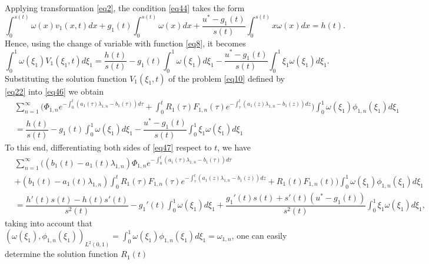 \documentclass[preprint,12pt,authoryear]{elsarticle}
\begin{document}
Applying transformation \eqref{eq2}, the condition \eqref{eq44} takes the form
\begin{equation}\label{eq45}
    \int_0^{s(t)}\omega(x)v_1(x,t)dx+g_1(t)\int_0^{s(t)}\omega(x)dx+\dfrac{u^*-g_1(t)}{s(t)}\int_0^{s(t)}x\omega(x)dx=h(t).
\end{equation}
Hence, using the change of variable with function \eqref{eq8}, it becomes 
\begin{equation}\label{eq46}
    \int_0^1 \omega(\xi_1)V_1(\xi_1,t)d\xi_1=\dfrac{h(t)}{s(t)}-g_1(t)\int_0^1\omega(\xi_1)d\xi_1-\dfrac{u^*-g_1(t)}{s(t)}\int_0^1\xi_1\omega(\xi_1)d\xi_1.
\end{equation}
Substituting the solution function $V_1(\xi_1,t)$ of the problem \eqref{eq10} defined by \eqref{eq22} into \eqref{eq46} we obtain
\begin{equation}\label{eq47}
    \begin{split}
        &\sum\limits_{n=1}^{\infty}\Bigg(\Phi_{1,n}e^{-\int_0^t(a_1(\tau)\lambda_{1,n}-b_1(\tau))d\tau}+\int_0^tR_1(\tau)F_{1,n}(\tau)e^{-\int_{\tau}^t(a_1(z)\lambda_{1,n}-b_1(z))dz}\Bigg)\int_0^1\omega(\xi_1)\phi_{1,n}(\xi_1)d\xi_1\\
        &=\dfrac{h(t)}{s(t)}-g_1(t)\int_0^1\omega(\xi_1)d\xi_1-\dfrac{u^*-g_1(t)}{s(t)}\int_0^1\xi_1\omega(\xi_1)d\xi_1
    \end{split}
\end{equation}
To this end, differentiating both sides of \eqref{eq47} respect to $t$, we have
\begin{equation}\label{eq48}
    \begin{split}
        &\sum\limits_{n=1}^{\infty}\Bigg((b_1(t)-a_1(t)\lambda_{1,n})\Phi_{1,n}e^{-\int_0^t(a_1(\tau)\lambda_{1,n}-b_1(\tau))d\tau}\\
        &+(b_1(t)-a_1(t)\lambda_{1,n})\int_0^tR_1(\tau)F_{1,n}(\tau)e^{-\int_{\tau}^t(a_1(z)\lambda_{1,n}-b_1(z))dz}+R_1(t)F_{1,n}(t)\Bigg)\int_0^1\omega(\xi_1)\phi_{1,n}(\xi_1)d\xi_1\\
        &=\dfrac{h'(t)s(t)-h(t)s'(t)}{s^2(t)}-g_1'(t)\int_0^1\omega(\xi_1)d\xi_1+\dfrac{g_1'(t)s(t)+s'(t)(u^*-g_1(t))}{s^2(t)}\int_0^1\xi_1\omega(\xi_1)d\xi_1,
    \end{split}
\end{equation}
taking into account that $\left(\omega(\xi_1),\phi_{1,n} (\xi_1)\right)_{L^2(0,1)}=\int_0^1\omega(\xi_1)\phi_{1,n}(\xi_1)d\xi_1=\omega_{1,n}$, one can easily determine the solution function $R_1(t)$
\end{document}
